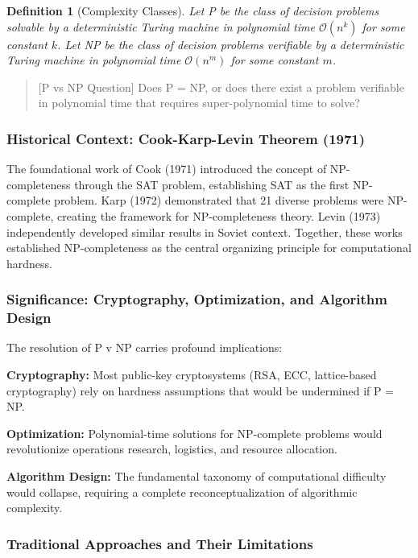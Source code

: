 \documentclass[11pt, letterpaper]{article}
\newtheorem{definition}[theorem]{Definition}
\begin{document}
\begin{definition}[Complexity Classes]
Let P be the class of decision problems solvable by a deterministic Turing machine in polynomial time $\mathcal{O}(n^k)$ for some constant $k$. Let NP be the class of decision problems verifiable by a deterministic Turing machine in polynomial time $\mathcal{O}(n^m)$ for some constant $m$.
\end{definition}

\begin{verse}
[P vs NP Question]
Does P = NP, or does there exist a problem verifiable in polynomial time that requires super-polynomial time to solve?
\end{verse}

\subsubsection{Historical Context: Cook-Karp-Levin Theorem (1971)}

The foundational work of Cook (1971) introduced the concept of NP-completeness through the SAT problem, establishing SAT as the first NP-complete problem. Karp (1972) demonstrated that 21 diverse problems were NP-complete, creating the framework for NP-completeness theory. Levin (1973) independently developed similar results in Soviet context. Together, these works established NP-completeness as the central organizing principle for computational hardness.

\subsubsection{Significance: Cryptography, Optimization, and Algorithm Design}

The resolution of P v NP carries profound implications:

\noindent\textbf{Cryptography:} Most public-key cryptosystems (RSA, ECC, lattice-based cryptography) rely on hardness assumptions that would be undermined if P = NP.

\noindent\textbf{Optimization:} Polynomial-time solutions for NP-complete problems would revolutionize operations research, logistics, and resource allocation.

\noindent\textbf{Algorithm Design:} The fundamental taxonomy of computational difficulty would collapse, requiring a complete reconceptualization of algorithmic complexity.

\subsubsection{Traditional Approaches and Their Limitations}
\end{document}
